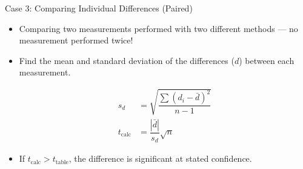 \documentclass[notes=only]{beamer}
\begin{document}
\begin{frame}{Case 3: Comparing Individual Differences (Paired)}
	\begin{itemize}
		\item Comparing two measurements performed with two different
			methods --- no measurement performed twice!
		\item Find the mean and standard deviation of the
			\alert{differences} ($d$) between each measurement.

			\begin{align*}
				s_d & = \sqrt{\dfrac{\sum{(d_i -
				\bar{d})}^2}{n-1}} \\
				t_{\text{calc}} &= \dfrac{|\bar{d}|}{s_d}
				\sqrt{n}
			\end{align*}

		\item If $t_{\text{calc}} > t_{\text{table}}$, the difference is
			significant at stated confidence.
	\end{itemize}
\end{frame}
\end{document}
